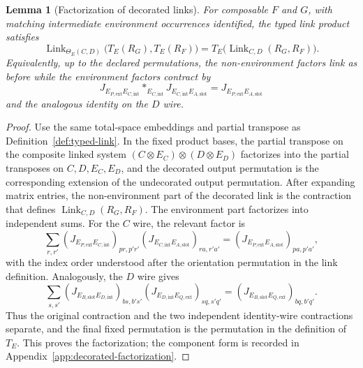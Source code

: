 \documentclass[11pt,a4paper]{article}
\theoremstyle{definition}
\theoremstyle{plain}
\newtheorem{lemma}[theorem]{Lemma}
\theoremstyle{remark}
\begin{document}
\begin{lemma}[Factorization of decorated links]
For composable $F$ and $G$, with matching intermediate environment
occurrences identified, the typed link product satisfies
\[
\operatorname{Link}_{\Theta_E(C,D)}
\bigl(T_E(R_G),T_E(R_F)\bigr)
=
T_E\bigl(\operatorname{Link}_{C,D}(R_G,R_F)\bigr).
\]
Equivalently, up to the declared permutations, the non-environment
factors link as before while the environment factors contract by
\[
J_{E_{P,\mathrm{ext}}E_{C,\mathrm{int}}}
*_{E_{C,\mathrm{int}}}
J_{E_{C,\mathrm{int}}E_{A,\mathrm{slot}}}
=J_{E_{P,\mathrm{ext}}E_{A,\mathrm{slot}}}
\]
and the analogous identity on the $D$ wire.
\end{lemma}
\begin{proof}
Use the same total-space embeddings and partial transpose as
Definition~\ref{def:typed-link}. In the fixed product bases, the partial
transpose on the composite linked system
$(C\otimes E_C)\otimes(D\otimes E_D)$ factorizes into the partial
transposes on $C,D,E_C,E_D$, and the decorated output permutation is the
corresponding extension of the undecorated output permutation. After
expanding matrix entries, the non-environment part of the decorated link
is the contraction
that defines $\operatorname{Link}_{C,D}(R_G,R_F)$. The environment part
factorizes into independent sums. For the $C$ wire, the relevant factor is
\[
\sum_{r,r'}
(J_{E_{P,\mathrm{ext}}E_{C,\mathrm{int}}})_{pr,p'r'}
(J_{E_{C,\mathrm{int}}E_{A,\mathrm{slot}}})_{ra,r'a'}
=(J_{E_{P,\mathrm{ext}}E_{A,\mathrm{slot}}})_{pa,p'a'},
\]
with the index order understood after the orientation permutation in the
link definition. Analogously, the $D$ wire gives
\[
\sum_{s,s'}
(J_{E_{B,\mathrm{slot}}E_{D,\mathrm{int}}})_{bs,b's'}
(J_{E_{D,\mathrm{int}}E_{Q,\mathrm{ext}}})_{sq,s'q'}
=(J_{E_{B,\mathrm{slot}}E_{Q,\mathrm{ext}}})_{bq,b'q'}.
\]
Thus the original contraction and the two independent identity-wire
contractions separate, and the final fixed permutation is the
permutation in the definition of $T_E$. This proves the factorization;
the component form is recorded in Appendix~\ref{app:decorated-factorization}.
\end{proof}
\end{document}
